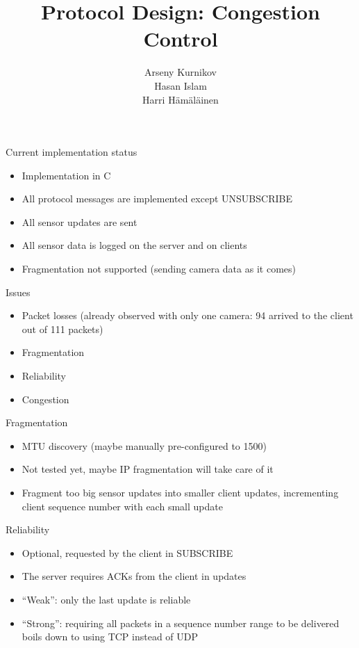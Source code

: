 \documentclass{beamer}
\title{Protocol Design: Congestion Control}
\author{Arseny Kurnikov\\
Hasan Islam\\
Harri Hämäläinen}
\begin{document}
\begin{frame}
\titlepage
\end{frame}


\begin{frame}{Current implementation status}
    \begin{itemize}
        \item Implementation in C
        \item All protocol messages are implemented except UNSUBSCRIBE
        \item All sensor updates are sent
        \item All sensor data is logged on the server and on clients
        \item Fragmentation not supported (sending camera data as it comes)
    \end{itemize}
\end{frame}

\begin{frame}{Issues}
    \begin{itemize}
        \item Packet losses (already observed with only one camera: 94 arrived
              to the client out of 111 packets)
        \item Fragmentation
        \item Reliability
        \item Congestion
    \end{itemize}
\end{frame}

\begin{frame}{Fragmentation}
    \begin{itemize}
        \item MTU discovery (maybe manually pre-configured to 1500)
        \item Not tested yet, maybe IP fragmentation will take care of it
        \item Fragment too big sensor updates into smaller client updates,
              incrementing client sequence number with each small update
    \end{itemize}
\end{frame}

\begin{frame}{Reliability}
    \begin{itemize}
        \item Optional, requested by the client in SUBSCRIBE
        \item The server requires ACKs from the client in updates
        \item ``Weak'': only the last update is reliable
        \item ``Strong'': requiring all packets in a sequence number range
              to be delivered boils down to using TCP instead of UDP
    \end{itemize}
\end{frame}
\end{document}
